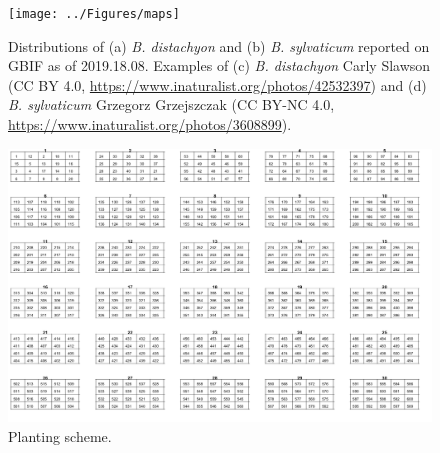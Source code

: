 \documentclass[jou,floatsintext]{apa6}
\begin{document}
\begin{figure}[!h]
\texttt{[image: ../Figures/maps]} \caption{Distributions of (a) \emph{B. distachyon} and (b) \emph{B. sylvaticum} reported on GBIF as of 2019.18.08. Examples of (c) \emph{B. distachyon} Carly Slawson (CC BY 4.0, \url{https://www.inaturalist.org/photos/42532397}) and (d) \emph{B. sylvaticum} Grzegorz Grzejszczak (CC BY-NC 4.0, \url{https://www.inaturalist.org/photos/3608899}).}\label{fig:maps}
\end{figure}



\begin{figure}[!h]
\includegraphics[width=\textwidth]{../Figures/racks_IDs} \caption{Planting scheme.}\label{fig:racks}
\end{figure}
\end{document}
